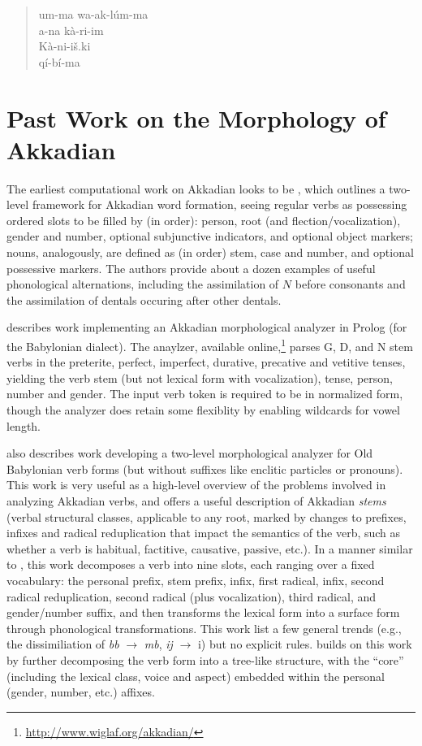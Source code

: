 \documentclass[11pt,letterpaper]{article}
\begin{document}
\begin{quote}
um-ma wa-ak-l\'um-ma\\
a-na k\`a-ri-im\\
K\`a-ni-i\v{s}.ki\\
q\'i-b\'i-ma
\end{quote}


\section{Past Work on the Morphology of Akkadian}

The earliest computational work on Akkadian looks to be \cite{Kataja:1988:FDS:991635.991699}, which outlines a two-level framework for Akkadian word formation, seeing regular verbs as possessing ordered slots to be filled by (in order): person, root (and flection/vocalization), gender and number, optional subjunctive indicators, and optional object markers; nouns, analogously, are defined as (in order) stem, case and number, and optional possessive markers.  The authors provide about a dozen examples of useful phonological alternations, including the assimilation of $N$ before consonants and the assimilation of dentals occuring after other dentals.

\cite{Macks:2002:PAV:1118637.1118638} describes work implementing an Akkadian morphological analyzer in Prolog (for the Babylonian dialect).  The anaylzer, available online,\footnote{\url{http://www.wiglaf.org/akkadian/}} parses G, D, and N stem verbs in the preterite, perfect, imperfect, durative, precative and vetitive tenses, yielding the verb stem (but not lexical form with vocalization), tense, person, number and gender.  The input verb token is required to be in normalized form, though the analyzer does retain some flexiblity by enabling wildcards for vowel length.

\cite{Barthelemy:1998:MAA:1621753.1621766} also describes work developing a two-level morphological analyzer for Old Babylonian verb forms (but without suffixes like enclitic particles or pronouns).  This work is very useful as a high-level overview of the problems involved in analyzing Akkadian verbs, and offers a useful description of Akkadian \emph{stems} (verbal structural classes, applicable to any root, marked by changes to prefixes, infixes and radical reduplication that impact the semantics of the verb, such as whether a verb is habitual, factitive, causative, passive, etc.).  In a manner similar to \cite{Kataja:1988:FDS:991635.991699}, this work decomposes a verb into nine slots, each ranging over a fixed vocabulary: the personal prefix, stem prefix, infix, first radical, infix, second radical reduplication, second radical (plus vocalization), third radical, and gender/number suffix, and then transforms the lexical form into a surface form through phonological transformations.  This work list a few general trends (e.g., the dissimiliation of \emph{bb} $\rightarrow$ \emph{mb}, \emph{ij} $\rightarrow$ {i}) but no explicit rules.  \cite{barthelemy2010} builds on this work by further decomposing the verb form into a tree-like structure, with the ``core'' (including the lexical class, voice and aspect) embedded within the personal (gender, number, etc.) affixes.
\end{document}
